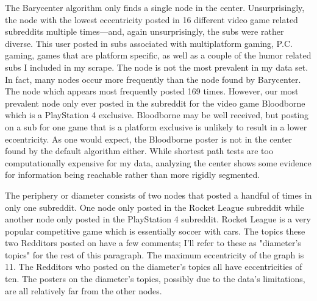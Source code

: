 \documentclass[12pt, a4paper]{article}
\begin{document}
The Barycenter algorithm only finds a single node in the center. Unsurprisingly, the node with the lowest eccentricity posted in 16 different video game related subreddits multiple times---and, again unsurprisingly, the subs were rather diverse. This user posted in subs associated with multiplatform gaming, P.C. gaming, games that are platform specific, as well as a couple of the humor related subs I included in my scrape. The node is not the most prevalent in my data set. In fact, many nodes occur more frequently than the node found by Barycenter. The node which appears most frequently posted 169 times. However, our most prevalent node only ever posted in the subreddit for the video game Bloodborne which is a PlayStation 4 exclusive. Bloodborne may be well received, but posting on a sub for one game that is a platform exclusive is unlikely to result in a lower eccentricity. As one would expect, the Bloodborne poster is not in the center found by the default algorithm either. While shortest path tests are too computationally expensive for my data, analyzing the center shows some evidence for information being reachable rather than more rigidly segmented.

The periphery or diameter consists of two nodes that posted a handful of times in only one subreddit. One node only posted in the Rocket League subreddit while another node only posted in the PlayStation 4 subreddit. Rocket League is a very popular competitive game which is essentially soccer with cars. The topics these two Redditors posted on have a few comments; I'll refer to these as "diameter's topics" for the rest of this paragraph. The maximum eccentricity of the graph is 11. The Redditors who posted on the diameter's topics all have eccentricities of ten. The posters on the diameter's topics, possibly due to the data's limitations, are all relatively far from the other nodes.
\end{document}

